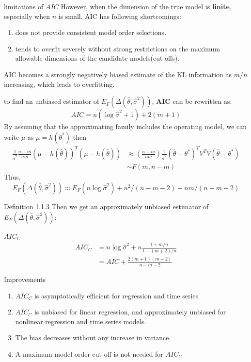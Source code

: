 \documentclass[11pt]{beamer}
\begin{document}
\begin{frame}{limitations of $AIC$}
However, when the dimension of the true model is \textbf{finite}, especially when $n$ is small, AIC has following shortcomings:\cite{hurvich1989regression}
\begin{enumerate}
    \item does not provide consistent model order selections\cite{hannan1979determination}.
    \item tends to overfit severely without strong restrictions on the maximum allowable dimensions of the candidate models(cut-offs).
\end{enumerate}
AIC becomes a strongly negatively biased estimate of the KL information as $m/n$ increasing, which leads to overfitting.
\end{frame}

\begin{frame}
    to find an unbiased estimator of $E_F(\Delta (\hat{\theta}, \hat{\sigma}^2))$, \textbf{AIC} can be rewritten as:
        \begin{equation}
        AIC = n(\log \hat{\sigma}^2+1)+2(m+1)
        \end{equation}
    By assuming that the approximating family includes the operating model, we can write $\mu$ as $\mu = h(\theta^*)$
    then 
    \begin{align}
        \frac{1}{\hat\sigma^2}\frac{n-m}{nm}(\mu-h(\hat\theta))^T(\mu-h(\hat\theta)) & \approx (\frac{n-m}{nm})\frac{1}{\hat\sigma^2}(\hat\theta-\theta^*)^TV^TV(\hat\theta-\theta^*) \\
        & \sim F(m, n-m)
     \end{align}
     Thus,$$E_F(\Delta (\hat{\theta}, \hat{\sigma}^2)) \approx E_F(n\log \hat\sigma^2)+n^2/(n-m-2)+nm/(n-m-2)$$
     
\end{frame}

\begin{frame}{Definition 1.1.3}
Then we get an approximately unbiased estimator of $E_F(\Delta (\hat{\theta}, \hat{\sigma}^2))$:
\begin{block}{$AIC_C$}
\begin{align}
    AIC_C &= n\log \hat\sigma^2 +n\frac{1+m/n}{1-(m+2)/n}\\
            &= AIC + \frac{2(m+1)(m+2)}{n-m-2}
\end{align}
\end{block}
\end{frame}

\begin{frame}{Improvements}
\begin{enumerate}
    \item $AIC_C$ is asymptotically efficient for regression and time series
    \item $AIC_C$ is unbiased for linear regression, and approximately unbiased for nonlinear regression and time series models.
    \item The bias decreases without any increase in variance.
    \item A maximum model order cut-off is not needed for $AIC_C$
\end{enumerate}
\end{frame}
\end{document}
